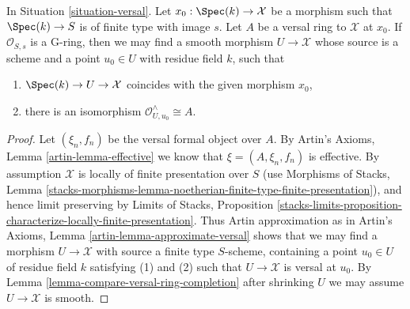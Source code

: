 \begin{lemma}
\label{lemma-Artin-approximation-by-smooth-morphism}
In Situation \ref{situation-versal}. Let $x_0 : \Spec(k) \to \mathcal{X}$
be a morphism such that $\Spec(k) \to S$ is of finite type with image $s$.
Let $A$ be a versal ring to $\mathcal{X}$ at $x_0$.
If $\mathcal{O}_{S, s}$ is a G-ring, then we may find a smooth morphism
$U \to \mathcal{X}$ whose source is a scheme and a point
$u_0 \in U$ with residue field $k$, such that
\begin{enumerate}
\item $\Spec(k) \to U \to \mathcal{X}$ coincides with the given morphism $x_0$,
\item there is an isomorphism $\mathcal{O}_{U, u_0}^\wedge \cong A$.
\end{enumerate}
\end{lemma}

\begin{proof}
Let $(\xi_n, f_n)$ be the versal formal object over $A$.
By Artin's Axioms, Lemma \ref{artin-lemma-effective}
we know that $\xi = (A, \xi_n, f_n)$ is effective.
By assumption $\mathcal{X}$ is locally of finite presentation over $S$
(use Morphisms of Stacks, Lemma
\ref{stacks-morphisms-lemma-noetherian-finite-type-finite-presentation}),
and hence limit preserving by Limits of Stacks, Proposition
\ref{stacks-limits-proposition-characterize-locally-finite-presentation}.
Thus Artin approximation as in
Artin's Axioms, Lemma \ref{artin-lemma-approximate-versal}
shows that we may find a morphism $U \to \mathcal{X}$ with
source a finite type $S$-scheme, containing a point $u_0 \in U$
of residue field $k$ satisfying (1) and (2) such that $U \to \mathcal{X}$
is versal at $u_0$. By Lemma \ref{lemma-compare-versal-ring-completion}
after shrinking $U$ we may assume $U \to \mathcal{X}$ is smooth.
\end{proof}

